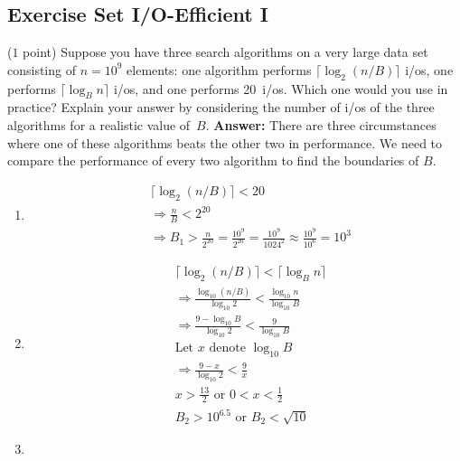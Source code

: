 \documentclass{article}
\newcommand{\io}{{\sc i/o}\xspace}
\newcommand{\ios}{{\io}s\xspace}
\newcounter{rcounter}
\newenvironment{rlist}%
{\begin{list}{\setnr-\arabic{rcounter}}{\usecounter{rcounter}}}{\end{list}}
\begin{document}
    \subsection*{Exercise Set I/O-Efficient I}
    \begin{rlist}
        
        \item ($1$ point)
        Suppose you have three search algorithms on a very large data set consisting of $n=10^9$ elements: one algorithm performs $\lceil \log_2 (n/B)\rceil$ \ios, one performs $\lceil \log_B n \rceil$ \ios, and one performs 20~\ios. Which one would you use in practice? Explain your answer by considering the number of \ios of the three algorithms for a realistic value of~$B$.
        \textbf{Answer:}
        There are three circumstances where one of these algorithms beats the other two in performance. We need to compare the performance of every two algorithm to find the boundaries of $B$.
        \begin{enumerate}
            \item[(i)]
            \begin{align*}
            &\lceil \log_2 (n/B)\rceil < 20 \\
            &\Longrightarrow \frac{n}{B} < 2^{20} \\
            &\Longrightarrow B_1 > \frac{n}{2^{20}} = \frac{10^9}{2^{20}} = \frac{10^9}{1024^2} \approx \frac{10^9}{10^6} = 10^3
            \end{align*}
            \item[(ii)]
            \begin{align*}
            &\lceil \log_2 (n/B)\rceil < \lceil \log_B n \rceil\\
            &\Longrightarrow \frac{\log_{10}(n/B)}{\log_{10}2} < \frac{\log_{10}n}{\log_{10}B} \\
            &\Longrightarrow \frac{9-\log_{10}B}{\log_{10}2} < \frac{9}{\log_{10}B} \\
            &\textrm{Let $x$ denote } \log_{10}B\\
            &\Longrightarrow \frac{9-x}{\log_{10}2} < \frac{9}{x} \\
            & x > \frac{13}{2} \textrm{ or } 0 < x <\frac{1}{2}\\
            & B_2 > 10^{6.5} \textrm{  or  } B_2 < \sqrt{10}
            \end{align*}
            \item[(iii)]

\end{enumerate}
\end{rlist}
\end{document}
